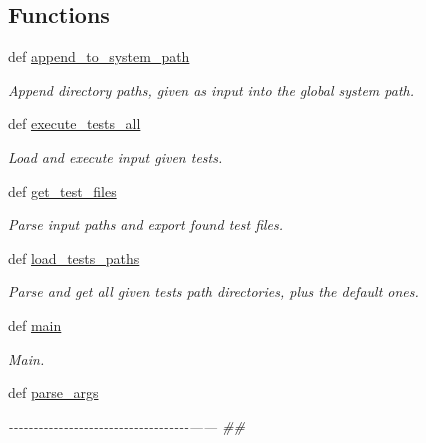 \subsection*{Functions}
\begin{DoxyCompactItemize}
\item 
def \hyperlink{namespacerapp__testing__tools_1_1rapp__testing__core_a7398ed9a9853b041ea219841b1ad1752}{append\-\_\-to\-\_\-system\-\_\-path}
\begin{DoxyCompactList}\small\item\em Append directory paths, given as input into the global system path. \end{DoxyCompactList}\item 
def \hyperlink{namespacerapp__testing__tools_1_1rapp__testing__core_aeb950d56b7a32adbe4a56b50fa2bdff6}{execute\-\_\-tests\-\_\-all}
\begin{DoxyCompactList}\small\item\em Load and execute input given tests. \end{DoxyCompactList}\item 
def \hyperlink{namespacerapp__testing__tools_1_1rapp__testing__core_a0e5ad01c811acd643730c8dc4868418a}{get\-\_\-test\-\_\-files}
\begin{DoxyCompactList}\small\item\em Parse input paths and export found test files. \end{DoxyCompactList}\item 
def \hyperlink{namespacerapp__testing__tools_1_1rapp__testing__core_a15a42599e55cb448a70f3a3019b4a82d}{load\-\_\-tests\-\_\-paths}
\begin{DoxyCompactList}\small\item\em Parse and get all given tests path directories, plus the default ones. \end{DoxyCompactList}\item 
def \hyperlink{namespacerapp__testing__tools_1_1rapp__testing__core_a5bbf286af74abf2591f8aadd812571b6}{main}
\begin{DoxyCompactList}\small\item\em Main. \end{DoxyCompactList}\item 
def \hyperlink{namespacerapp__testing__tools_1_1rapp__testing__core_ac00a2d9e61a3d94a4f306761dfd6c780}{parse\-\_\-args}
\begin{DoxyCompactList}\small\item\em -\/-\/-\/-\/-\/-\/-\/-\/-\/-\/-\/-\/-\/-\/-\/-\/-\/-\/-\/-\/-\/-\/-\/-\/-\/-\/-\/-\/-\/-\/-\/-\/-\/-\/-\/-\/------ \#\# \end{DoxyCompactList}\end{DoxyCompactItemize}
